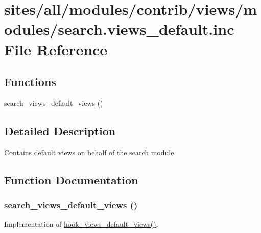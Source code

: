 \hypertarget{search_8views__default_8inc}{
\section{sites/all/modules/contrib/views/modules/search.views\_\-default.inc File Reference}
\label{search_8views__default_8inc}
}
\subsection*{Functions}
\begin{CompactItemize}
\item 
\hyperlink{search_8views__default_8inc_2cb88621066893a307a7526fe6a5d70d}{search\_\-views\_\-default\_\-views} ()
\end{CompactItemize}


\subsection{Detailed Description}
Contains default views on behalf of the search module. 

\subsection{Function Documentation}
\hypertarget{search_8views__default_8inc_2cb88621066893a307a7526fe6a5d70d}{
\subsubsection[{search\_\-views\_\-default\_\-views}]{\setlength{\rightskip}{0pt plus 5cm}search\_\-views\_\-default\_\-views ()}}
\label{search_8views__default_8inc_2cb88621066893a307a7526fe6a5d70d}


Implementation of \hyperlink{group__views__hooks_g23edb74860682fa88f75cf94b97c2e15}{hook\_\-views\_\-default\_\-views()}. 